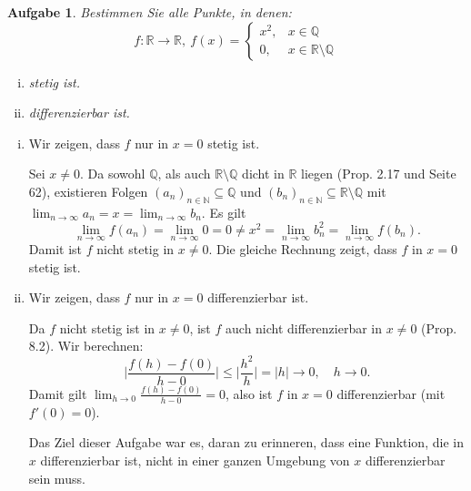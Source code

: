 \documentclass[a4paper, 20]{exam}
\newtheorem{ex}{Aufgabe}
\newcommand\RR{\mathbb{R}}
\newcommand\NN{\mathbb{N}}
\newcommand\QQ{\mathbb{Q}}
\begin{document}
\begin{ex}
Bestimmen Sie alle Punkte, in denen:
$$f:\RR \longrightarrow \RR,~ f(x)= \left\{\begin{array}{lr}  x^2 , & x\in \QQ \\
0,  & x \in \RR \setminus \QQ \end{array}\right.$$
\begin{enumerate}[i.)]
\item
stetig ist.
\item
differenzierbar ist.
\end{enumerate}
\end{ex}
\begin{solution}
\begin{enumerate}[i.)]
\item
Wir zeigen, dass $f$ nur in $x=0$ stetig ist.

Sei $x\neq 0$. Da sowohl $\QQ$, als auch $\RR \setminus \QQ$ dicht in $\RR$ liegen (Prop. 2.17 und Seite 62), existieren Folgen $(a_n)_{n\in \NN} \subseteq \QQ$ und $(b_n)_{n \in \NN} \subseteq \RR \setminus \QQ$ mit $\lim_{n\rightarrow \infty} a_n = x =\lim_{n \rightarrow \infty} b_n$. Es gilt 
$$ \lim_{n\rightarrow \infty} f(a_n) = \lim_{n \rightarrow \infty} 0 = 0 
\neq x^2 = \lim_{n \rightarrow \infty} b_n^2 = \lim_{n \rightarrow \infty} f(b_n).$$
Damit ist $f$ nicht stetig in $x\neq 0$. Die gleiche Rechnung zeigt, dass $f$ in $x=0$ stetig ist.
\item
Wir zeigen, dass $f$ nur in $x=0$ differenzierbar ist.

Da $f$ nicht stetig ist in $x\neq 0$, ist $f$ auch nicht differenzierbar in $x\neq 0$ (Prop. 8.2). Wir berechnen:
$$ \bigg\vert \frac{f(h)-f(0)}{h-0} \bigg\vert \leq \bigg\vert \frac{h^2}{h} \bigg\vert = \vert h \vert \longrightarrow 0,
\quad h\longrightarrow 0.$$
Damit gilt $\lim_{h\rightarrow 0}\frac{f(h)-f(0)}{h-0}=0$, also ist $f$ in $x=0$ differenzierbar (mit $f'(0)=0$).

Das Ziel dieser Aufgabe war es, daran zu erinneren, dass eine Funktion, die in $x$ differenzierbar ist, nicht in einer ganzen Umgebung von $x$ differenzierbar sein muss. 
\end{enumerate}
\end{solution}
\end{document}
